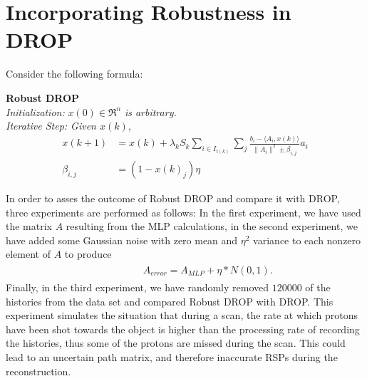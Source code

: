 \chapter{Incorporating Robustness in DROP}

Consider the following formula:

\vspace{5mm}\noindent\textbf{Robust DROP} \\
\textit{Initialization:} $x(0) \in \mathfrak{R}^n$ \textit{is arbitrary.}\\
\textit{Iterative Step: Given $x(k)$, }
\begin{align} \label{alg:1}
         x({k+1}) &= x(k) + \lambda_k S_k \sum_{i \in I_{t(k)}} \sum_{j} \frac{b_i - \langle A_i,x(k) \rangle}{\|A_i\|^2 \pm \beta_{i,j}} a_i 
         \\
         \beta_{i,j} &= (1 - {x(k)}_{j}) \eta
\end{align}

In order to asses the outcome of Robust DROP and compare it with DROP, three experiments are performed as follows: In the first experiment, we have used the matrix $A$ resulting from the MLP calculations, in the second experiment, we have added some Gaussian noise with zero mean and $\eta^2$ variance to each nonzero element of $A$ to produce 
\begin{align} \label{eq:2.1}
    \phantom{i + j + k}
    &\begin{aligned}
        A_{error} = A_{MLP} + \eta * N(0,1).
    \end{aligned}
\end{align}
Finally, in the third experiment, we have randomly removed $120000$ of the histories from the data set and compared Robust DROP with DROP. This experiment simulates the situation that during a scan, the rate at which protons have been shot towards the object is higher than the processing rate of  recording the histories, thus some of the protons are missed during the scan. This could lead to an uncertain path matrix, and therefore inaccurate RSPs during the reconstruction.







